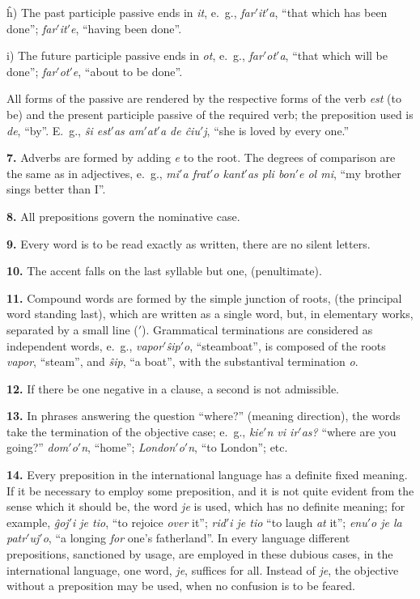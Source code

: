 ĥ) The past participle passive ends in \emph{it}, e.~g., \emph{far$'$it$'$a}, “that which has been done”; \emph{far$'$it$'$e}, “having been done”.

i) The future participle passive ends in \emph{ot}, e.~g., \emph{far$'$ot$'$a}, “that which will be done”; \emph{far$'$ot$'$e}, “about to be done”.

All forms of the passive are rendered by the respective forms of the verb \emph{est} (to be) and the present participle passive of the required verb; the preposition used is \emph{de}, “by”. E.~g., \emph{ŝi est$'$as am$'$at$'$a de ĉiu$'$j}, “she is loved by every one.”

\textbf{7.} Adverbs are formed by adding \emph{e} to the root. The degrees of comparison are the same as in adjectives, e.~g., \emph{mi$'$a frat$'$o kant$'$as pli bon$'$e ol mi}, “my brother sings better than I”.

\textbf{8.} All prepositions govern the nominative case.

\begin{center}
\large {}
\end{center}

\textbf{9.} Every word is to be read exactly as written, there are no silent letters.

\textbf{10.} The accent falls on the last syllable but one, (penultimate).

\textbf{11.} Compound words are formed by the simple junction of roots, (the principal word standing last), which are written as a single word, but, in elementary works, separated by a small line ($'$). Grammatical terminations are considered as independent words, e.~g., \emph{vapor$'$ŝip$'$o}, “steamboat”, is composed of the roots \emph{vapor}, “steam”, and \emph{ŝip}, “a boat”, with the substantival termination \emph{o}.

\textbf{12.} If there be one negative in a clause, a second is not admissible.

\textbf{13.} In phrases answering the question “where?” (meaning direction), the words take the termination of the objective case; e.~g., \emph{kie$'$n vi ir$'$as?} “where are you going?” \emph{dom$'$o$'$n}, “home”; \emph{London$'$o$'$n}, “to London”; etc.

\textbf{14.} Every preposition in the international language has a definite fixed meaning. If it be necessary to employ some preposition, and it is not quite evident from the sense which it should be, the word \emph{je} is used, which has no definite meaning; for example, \emph{ĝoj$'$i je tio}, “to rejoice \emph{over} it”; \emph{rid$'$i je tio} “to laugh \emph{at} it”; \emph{enu$'$o je la patr$'$uj$'$o}, “a longing \emph{for} one’s fatherland”. In every language different prepositions, sanctioned by usage, are employed in these dubious cases, in the international language, one word, \emph{je}, suffices for all. Instead of \emph{je}, the objective without a preposition may be used, when no confusion is to be feared.

